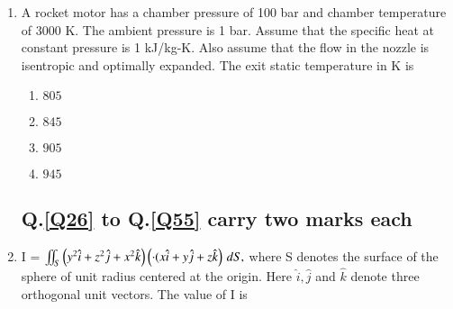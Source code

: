 \documentclass[journal,12pt,onecolumn]{IEEEtran}
\theoremstyle{remark}
\begin{document}
\begin{enumerate}
\begin{enumerate}
    \end{enumerate}


    \item A rocket motor has a chamber pressure of 100 bar and chamber temperature of 3000 K. The ambient pressure is 1 bar. Assume that the specific heat at constant pressure is 1 kJ/kg-K. Also assume that the flow in the nozzle is isentropic and optimally expanded. The exit static temperature in K is 

    \begin{enumerate}
        \item $805$
        \item $845$
        \item $905$
        \item $945$
    \end{enumerate}

    \subsection{Q.\ref{Q26} to Q.\ref{Q55} carry two marks each} \label{subsec:twomarks}

    \item \label{Q26} I = $\iint_S \left( y^2 \hat{i} + z^2 \hat{j} + x^2 \hat{k} \right)\left( \cdot ( x \hat{i} + y \hat{j} + z \hat{k}\right) \, dS,$  where S denotes the surface of the sphere of unit radius centered at the origin. Here $\hat{i}, \hat{j}$ and $\hat{k}$  denote three orthogonal unit vectors. The value of I is \underline{\hspace{2cm}}



    
\end{enumerate}
\end{document}
